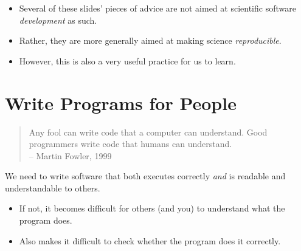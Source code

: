 \documentclass[english]{beamer}
\newcommand{\sectionslide}{\centering\vspace*{25mm}%
  {\bfseries\LARGE \insertsection}}
\begin{document}

\begin{frame}{\insertsection}
  \begin{itemize}
  \item Several of these slides' pieces of advice are not aimed at
    scientific software \emph{development} as such.
  \item Rather, they are more generally aimed at making science
    \emph{reproducible}.
  \item However, this is also a very useful practice for us to learn.
  \end{itemize}
\end{frame}


\section{Write Programs for People}

\begin{frame}
  \sectionslide
\end{frame}


\begin{frame}{\insertsection}
  \begin{quote}
    Any fool can write code that a computer can understand. Good
    programmers write code that humans can understand.\\
    \hfill -- Martin Fowler, 1999
  \end{quote}
  We need to write software that both executes correctly \emph{and} is
  readable and understandable to others.
  \begin{itemize}
  \item If not, it becomes difficult for others (and \alert{you}) to
    understand what the program does.
  \item Also makes it difficult to check whether the program does it
    correctly.
  \end{itemize}
\end{frame}

\end{document}
